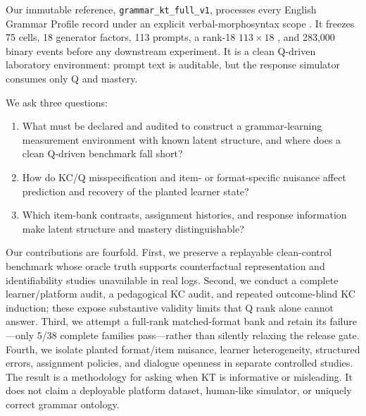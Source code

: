 Our immutable reference, \texttt{grammar\_kt\_full\_v1}, processes every
English Grammar Profile record under an explicit verbal-morphosyntax scope
\citep{okeeffe-mark-2017}.  It freezes 75 cells, 18 generator factors, 113
prompts, a rank-18 $113\times18$ \qstar{}, and 283,000 binary events before any
downstream experiment.  It is a clean Q-driven laboratory environment: prompt
text is auditable, but the response simulator consumes only Q and mastery.

We ask three questions:
\begin{enumerate}
  \item[RQ1] What must be declared and audited to construct a grammar-learning
    measurement environment with known latent structure, and where does a clean
    Q-driven benchmark fall short?
  \item[RQ2] How do KC/Q misspecification and item- or format-specific nuisance
    affect prediction and recovery of the planted learner state?
  \item[RQ3] Which item-bank contrasts, assignment histories, and response
    information make latent structure and mastery distinguishable?
\end{enumerate}

Our contributions are fourfold.  First, we preserve a replayable clean-control
benchmark whose oracle truth supports counterfactual representation and
identifiability studies unavailable in real logs.  Second, we conduct a
complete learner/platform audit, a pedagogical KC audit, and repeated
outcome-blind KC induction; these expose substantive validity limits that Q
rank alone cannot answer.  Third, we attempt a full-rank matched-format bank and
retain its failure---only 5/38 complete families pass---rather than silently
relaxing the release gate.  Fourth, we isolate planted format/item nuisance,
learner heterogeneity, structured errors, assignment policies, and dialogue
openness in separate controlled studies.  The result is a methodology for
asking when KT is informative or misleading.  It does not claim a deployable
platform dataset, human-like simulator, or uniquely correct grammar ontology.


